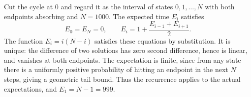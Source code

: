 Cut the cycle at $0$ and regard it as the interval of states $0,1,\ldots,N$ with both endpoints absorbing and $N=1000$. The expected time $E_i$ satisfies
\[
E_0=E_N=0,\qquad E_i=1+\dfrac{E_{i-1}+E_{i+1}}{2}.
\]
The function $E_i=i(N-i)$ satisfies these equations by substitution. It is unique: the difference of two solutions has zero second difference, hence is linear, and vanishes at both endpoints.
The expectation is finite, since from any state there is a uniformly positive probability of hitting an endpoint in the next $N$ steps, giving a geometric tail bound. Thus the recurrence applies to the actual expectations, and $\boxed{E_1=N-1=999}$.
